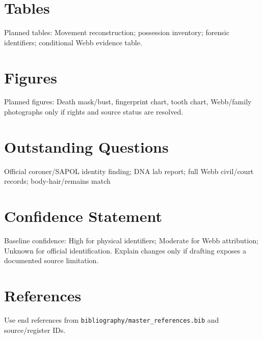 \section{Tables}
Planned tables: Movement reconstruction; possession inventory; forensic identifiers; conditional Webb evidence table.

\section{Figures}
Planned figures: Death mask/bust, fingerprint chart, tooth chart, Webb/family photographs only if rights and source status are resolved.

\section{Outstanding Questions}
Official coroner/SAPOL identity finding; DNA lab report; full Webb civil/court records; body-hair/remains match

\section{Confidence Statement}
Baseline confidence: High for physical identifiers; Moderate for Webb attribution; Unknown for official identification. Explain changes only if drafting exposes a documented source limitation.

\section{References}
Use end references from \texttt{bibliography/master_references.bib} and source/register IDs.

